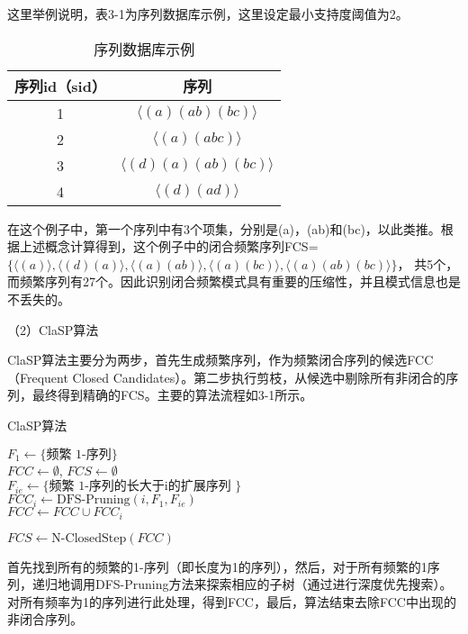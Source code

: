 这里举例说明，表3-1为序列数据库示例，这里设定最小支持度阈值为2。

\begin{table}[htbp]
\caption{序列数据库示例}
\vspace{0.5em}\centering\wuhao
\begin{tabular}{cc}
\toprule
序列id（sid） & 序列 \\
\midrule
1 &  $\langle (a)(ab)(bc)\rangle$\\
2 &  $\langle (a)(abc) \rangle$\\
3 &  $\langle (d)(a)(ab)(bc) \rangle$\\
4 &  $\langle  (d)(ad)\rangle$\\
\bottomrule
\end{tabular}
\end{table}

在这个例子中，第一个序列中有3个项集，分别是(a)，(ab)和(bc)，以此类推。根据上述概念计算得到，这个例子中的闭合频繁序列FCS=\(\{ \langle (a)\rangle, \langle (d)(a)\rangle, \langle (a)(ab)\rangle, \langle (a)(bc)\rangle, \langle (a)(ab)(bc)\rangle \}\)， 共5个，而频繁序列有27个。因此识别闭合频繁模式具有重要的压缩性，并且模式信息也是不丢失的。

（2）ClaSP算法

ClaSP算法主要分为两步，首先生成频繁序列，作为频繁闭合序列的候选FCC（Frequent Closed Candidates）。第二步执行剪枝，从候选中剔除所有非闭合的序列，最终得到精确的FCS。主要的算法流程如3-1所示。

\begin{algorithm}
\caption{ClaSP算法}
 $F_1 \gets \{\text{频繁 1-序列}\}$ \\
 $FCC \gets \emptyset$, $FCS \gets \emptyset$  \\
{
    $F_{ie} \gets \{\text{频繁 1-序列的长大于i的扩展序列 } \}$ \\
    $FCC_i \gets \text{DFS-Pruning}(i, F_1, F_{ie})$ \\
    $FCC \gets FCC \cup FCC_i$
}

 $FCS \gets \text{N-ClosedStep}(FCC)$
\end{algorithm}


首先找到所有的频繁的1-序列（即长度为1的序列），然后，对于所有频繁的1序列，递归地调用DFS-Pruning方法来探索相应的子树（通过进行深度优先搜索）。对所有频率为1的序列进行此处理，得到FCC，最后，算法结束去除FCC中出现的非闭合序列。


